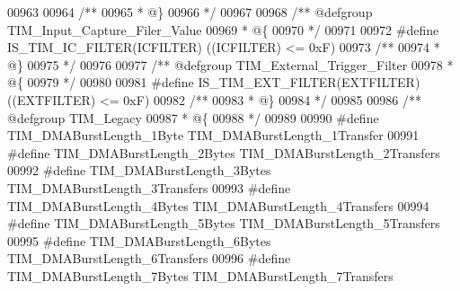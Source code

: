 \begin{DoxyCode}
00963 
00964 \textcolor{comment}{/**}
00965 \textcolor{comment}{  * @\}}
00966 \textcolor{comment}{  */}
00967 
00968 \textcolor{comment}{/** @defgroup TIM\_Input\_Capture\_Filer\_Value }
00969 \textcolor{comment}{  * @\{}
00970 \textcolor{comment}{  */}
00971 
00972 \textcolor{preprocessor}{#}\textcolor{preprocessor}{define} \textcolor{preprocessor}{IS\_TIM\_IC\_FILTER}\textcolor{preprocessor}{(}\textcolor{preprocessor}{ICFILTER}\textcolor{preprocessor}{)} \textcolor{preprocessor}{(}\textcolor{preprocessor}{(}\textcolor{preprocessor}{ICFILTER}\textcolor{preprocessor}{)} \textcolor{preprocessor}{<=} 0xF\textcolor{preprocessor}{)}
00973 \textcolor{comment}{/**}
00974 \textcolor{comment}{  * @\}}
00975 \textcolor{comment}{  */}
00976 
00977 \textcolor{comment}{/** @defgroup TIM\_External\_Trigger\_Filter }
00978 \textcolor{comment}{  * @\{}
00979 \textcolor{comment}{  */}
00980 
00981 \textcolor{preprocessor}{#}\textcolor{preprocessor}{define} \textcolor{preprocessor}{IS\_TIM\_EXT\_FILTER}\textcolor{preprocessor}{(}\textcolor{preprocessor}{EXTFILTER}\textcolor{preprocessor}{)} \textcolor{preprocessor}{(}\textcolor{preprocessor}{(}\textcolor{preprocessor}{EXTFILTER}\textcolor{preprocessor}{)} \textcolor{preprocessor}{<=} 0xF\textcolor{preprocessor}{)}
00982 \textcolor{comment}{/**}
00983 \textcolor{comment}{  * @\}}
00984 \textcolor{comment}{  */}
00985 
00986 \textcolor{comment}{/** @defgroup TIM\_Legacy }
00987 \textcolor{comment}{  * @\{}
00988 \textcolor{comment}{  */}
00989 
00990 \textcolor{preprocessor}{#}\textcolor{preprocessor}{define} \textcolor{preprocessor}{TIM\_DMABurstLength\_1Byte}           TIM_DMABurstLength_1Transfer
00991 \textcolor{preprocessor}{#}\textcolor{preprocessor}{define} \textcolor{preprocessor}{TIM\_DMABurstLength\_2Bytes}          TIM_DMABurstLength_2Transfers
00992 \textcolor{preprocessor}{#}\textcolor{preprocessor}{define} \textcolor{preprocessor}{TIM\_DMABurstLength\_3Bytes}          TIM_DMABurstLength_3Transfers
00993 \textcolor{preprocessor}{#}\textcolor{preprocessor}{define} \textcolor{preprocessor}{TIM\_DMABurstLength\_4Bytes}          TIM_DMABurstLength_4Transfers
00994 \textcolor{preprocessor}{#}\textcolor{preprocessor}{define} \textcolor{preprocessor}{TIM\_DMABurstLength\_5Bytes}          TIM_DMABurstLength_5Transfers
00995 \textcolor{preprocessor}{#}\textcolor{preprocessor}{define} \textcolor{preprocessor}{TIM\_DMABurstLength\_6Bytes}          TIM_DMABurstLength_6Transfers
00996 \textcolor{preprocessor}{#}\textcolor{preprocessor}{define} \textcolor{preprocessor}{TIM\_DMABurstLength\_7Bytes}          TIM_DMABurstLength_7Transfers

\end{DoxyCode}
